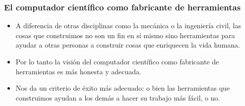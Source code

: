\documentclass[spanish]{beamer}
\begin{document}
\begin{frame}
  \frametitle{El computador científico como fabricante de herramientas}

  \begin{itemize}
    \item  A diferencia de otras disciplinas como la mecánica o la ingeniería
      civil, las cosas que construimos no son un fin en sí mismo sino
      herramientas para ayudar a otras personas a construir cosas que
      enriquecen la vida humana.

    \pause

    \item Por lo tanto la visión del computador científico como fabricante de
      herramientas es más honesta y adecuada.

    \pause

   \item Nos da un criterio de éxito más adecuado: o bien las herramientas que
     construimos ayudan a los demás a hacer su trabajo más fácil, o no.
  \end{itemize}
\end{frame}
\end{document}
